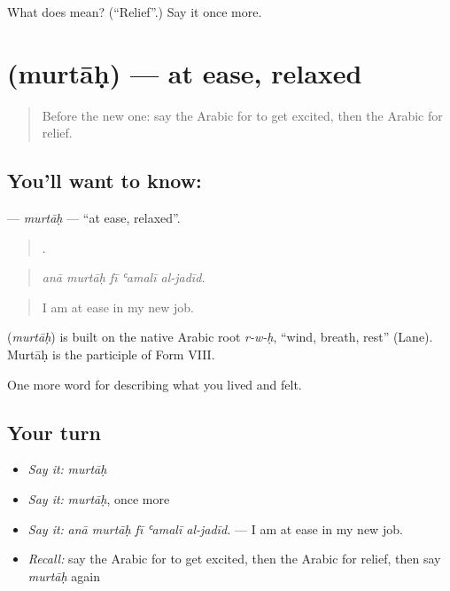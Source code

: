 \begin{tcolorbox}[breakable,colback=teal!4,colframe=teal!35!black,title={Before you move on}]
What does  mean? (\textquotedblleft{}Relief\textquotedblright{}.) Say it once more.
\end{tcolorbox}
\section[\texorpdfstring{\ar{مرتاح} (murtāḥ)}{مرتاح (murtāḥ)}]{ (murtāḥ) — at ease, relaxed}

\label{lesson:AR-C496-murtah}



\begin{quote}
Before the new one: say the Arabic for to get excited, then the Arabic for relief.
\end{quote}

\subsection*{You'll want to know: }
\textbf{} — \emph{murtāḥ} — \textquotedblleft{}at ease, relaxed\textquotedblright{}.

\begin{quote}
    .
\end{quote}

\begin{quote}
\emph{anā murtāḥ fī ʿamalī al-jadīd.}
\end{quote}

\begin{quote}
I am at ease in my new job.
\end{quote}

\begin{cousinweb}
\textbf{} (\emph{murtāḥ}) is built on the native Arabic root \emph{r-w-ḥ}, \textquotedblleft{}wind, breath, rest\textquotedblright{} (Lane). Murtāḥ is the participle of Form VIII.
\end{cousinweb}

\begin{grammarlens}[title={What you've built}]
One more word for describing what you lived and felt.
\end{grammarlens}

\subsection*{Your turn}
\begin{itemize}
\raggedright
  \item \emph{Say it:} \emph{murtāḥ}
  \item \emph{Say it:} \emph{murtāḥ}, once more
  \item \emph{Say it:} \emph{anā murtāḥ fī ʿamalī al-jadīd.} — I am at ease in my new job.
  \item \emph{Recall:} say the Arabic for to get excited, then the Arabic for relief, then say \emph{murtāḥ} again
\end{itemize}

